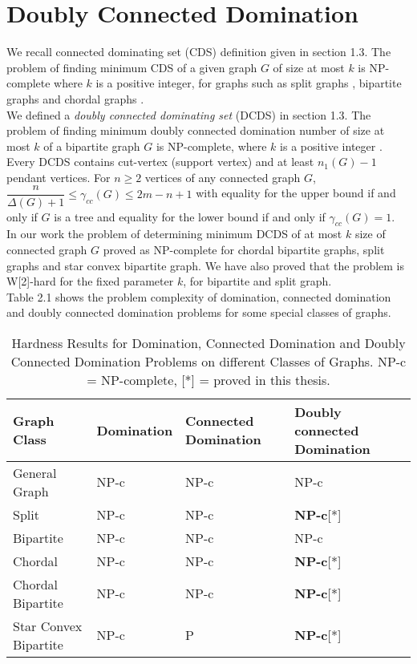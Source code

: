 \section{Doubly Connected Domination}
\noindent
We recall connected dominating set (CDS) definition given in section 1.3. The problem of finding minimum CDS of a given graph $G$ of size at most $k$ is NP-complete where $k$ is a positive integer, for graphs such as split graphs \cite{Las1}, bipartite graphs \cite{Las2} and chordal graphs \cite{Las3}. \smallskip \\
We defined a \textit{doubly connected dominating set} (DCDS) in section 1.3. The problem of finding minimum doubly connected domination number  of size at most $k$ of a bipartite graph $G$ is NP-complete, where $k$ is a positive integer \cite{dcds}.\\
Every DCDS contains cut-vertex (support vertex) and at least $n_1(G)-1$ pendant vertices. For $n \geq 2$ vertices of any connected graph $G$, $\dfrac{n}{\Delta(G)+1} \leq \gamma_{cc}(G) \leq 2m-n+1 $ with equality for the upper bound if and only if $G$ is a tree and equality for the lower bound if and only if $\gamma_{cc}(G) = 1$. \\
In our work the problem of determining minimum DCDS of at most $k$ size of connected graph $G$ proved as NP-complete for chordal bipartite graphs, split graphs and star convex bipartite graph. We have also proved that the problem is W[2]-hard for the fixed parameter $k$, for bipartite and split graph.\\
\noindent
Table 2.1 shows the problem complexity of domination, connected domination and doubly connected domination problems for some special classes of graphs. 
\begin{table}[H]
\centering
\begin{tabular}{| m{3.8cm} | m{2cm} | m{3.8cm} | m{5cm} |}
\hline \hline
\small \textbf{Graph Class} & \small \textbf{Domination} & \small \textbf{Connected Domination} & \small \textbf{Doubly connected Domination} \\
\hline \hline
General Graph & NP-c \cite{Haynes} & NP-c \cite{Haynes} & NP-c \cite{dcds} \\
\hline
Split &  NP-c \cite{Bertossi} & NP-c \cite{Las1} & \textbf{NP-c}[*]  \\
\hline
Bipartite & NP-c \cite{Bertossi} & NP-c \cite{Las2} &  NP-c \cite{dcds}\\
\hline
Chordal & NP-c \cite{Booth} & NP-c \cite{Las1} & \textbf{NP-c}[*] \\
\hline
Chordal Bipartite & NP-c \cite{Brand1} & {NP-c}\cite{Brand1}  & \textbf{NP-c}[*]  \\
\hline
Star Convex Bipartite & {NP-c} \cite{tcbg}& P \cite{jiang}& \textbf{NP-c}[*]  \\
\hline
\end{tabular}
\caption{Hardness Results for Domination, Connected Domination and Doubly Connected Domination Problems on different Classes of Graphs. NP-c = NP-complete, [*] = proved in this thesis.}
\end{table}
